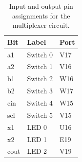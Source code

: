 \documentclass[11pt]{article}
\begin{document}
\begin{table}[H]
\begin{center}
	\begin{tabular}{| l | l | l |}
		\hline
		Bit & Label & Port \\ \hline
		a1 & Switch 0 & V17 \\ \hline
		a2 & Switch 1 & V16 \\ \hline
		b1 & Switch 2 & W16 \\ \hline
		b2 & Switch 3 & W17 \\ \hline
		cin & Switch 4 & W15 \\ \hline
		sel & Switch 5 & V15 \\ \hline
		x1 & LED 0 & U16 \\ \hline
		x2 & LED 1 & E19 \\ \hline
		cout & LED 2 & V19 \\ \hline
	\end{tabular}
	\caption{\label{tab:ledMuxPorts}Input and output pin assignments for the multiplexer circuit.}
\end{center}	
\end{table}
\end{document}
